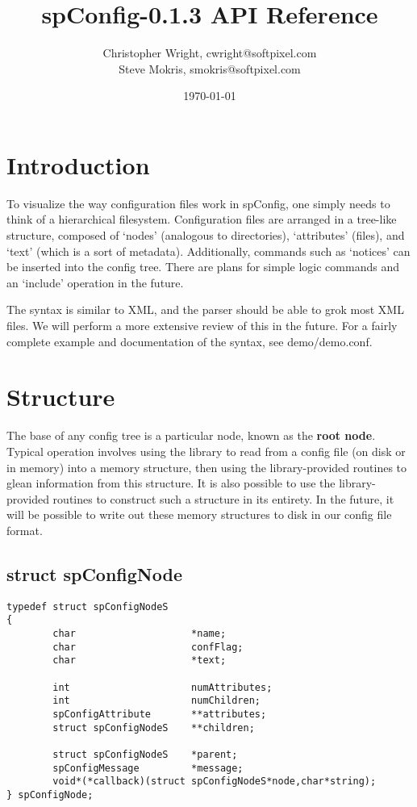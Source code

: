 \documentclass[10pt]{article}
\title{spConfig-0.1.3 API Reference}
\author{Christopher Wright, cwright@softpixel.com\\
	Steve Mokris, smokris@softpixel.com}
\date{\today}
\begin{document}
\maketitle

\tableofcontents

\section{Introduction}

To visualize the way configuration files work in spConfig, one simply needs to
think of a hierarchical filesystem.  Configuration files are arranged in a
tree-like structure, composed of `nodes' (analogous to directories),
`attributes' (files), and `text' (which is a sort of metadata).  Additionally,
commands such as `notices' can be inserted into the config tree. There are
plans for simple logic commands and an `include' operation in the future.

The syntax is similar to XML, and the parser should be able to grok most XML
files.  We will perform a more extensive review of this in the future.  For a
fairly complete example and documentation of the syntax, see demo/demo.conf.




\pagebreak

\section{Structure}

The base of any config tree is a particular node, known as the \textbf{root
node}.  Typical operation involves using the library to read from a config file
(on disk or in memory) into a memory structure, then using the library-provided
routines to glean information from this structure.  It is also possible to use
the library-provided routines to construct such a structure in its entirety. 
In the future, it will be possible to write out these memory structures to disk
in our config file format.

\subsection{struct spConfigNode}

\begin{verbatim}typedef struct spConfigNodeS
{
        char                    *name;
        char                    confFlag;
        char                    *text;
        
        int                     numAttributes;
        int                     numChildren;
        spConfigAttribute       **attributes;
        struct spConfigNodeS    **children;
	
        struct spConfigNodeS    *parent;
        spConfigMessage         *message;
        void*(*callback)(struct spConfigNodeS*node,char*string);
} spConfigNode;\end{verbatim}
\end{document}
